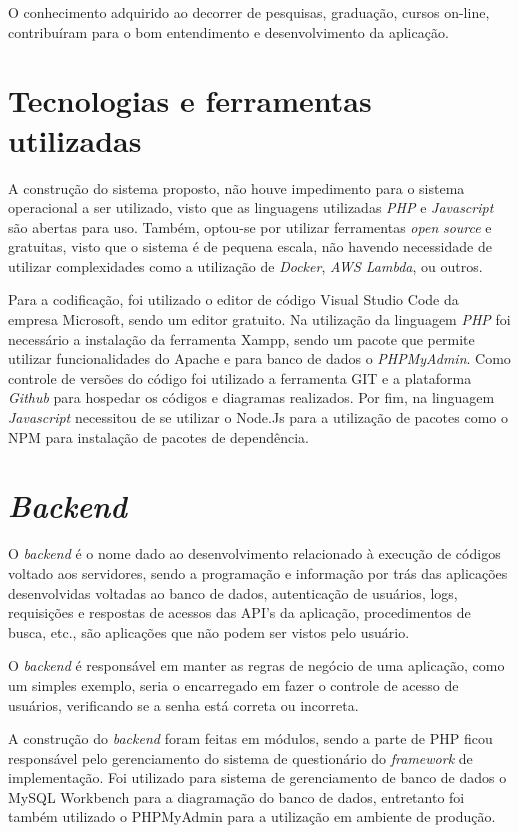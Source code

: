 \documentclass[
	12pt,				%
	openright,			%
	oneside,			%
	a4paper,			%
	english,			%
	french,				%
	spanish,			%
	brazil,				%
	]{abntex2}
\begin{document}
O conhecimento adquirido ao decorrer de pesquisas, graduação, cursos on-line, contribuíram para o bom entendimento e desenvolvimento da aplicação.


\section{Tecnologias e ferramentas utilizadas}

A construção do sistema proposto, não houve impedimento para o sistema operacional a ser utilizado, visto que as linguagens utilizadas \textit{PHP} e \textit{Javascript} são abertas para uso. Também, optou-se por utilizar ferramentas \textit{open} \textit{source} e gratuitas, visto que o sistema é de pequena escala, não havendo necessidade de utilizar complexidades como a utilização de \textit{Docker}, \textit{AWS Lambda}, ou outros.

Para a codificação, foi utilizado o editor de código Visual Studio Code da empresa Microsoft, sendo um editor gratuito. Na utilização da linguagem \textit{PHP} foi necessário a instalação da ferramenta Xampp, sendo um pacote que permite utilizar funcionalidades do Apache e para banco de dados o \textit{PHPMyAdmin}. Como controle de versões do código foi utilizado a ferramenta GIT e a plataforma \textit{Github} para hospedar os códigos e diagramas realizados. Por fim, na linguagem \textit{Javascript} necessitou de se utilizar o Node.Js para a utilização de pacotes como o NPM para instalação de pacotes de dependência.  

\section{\textit{Backend}}

O \textit{backend} é o nome dado ao desenvolvimento relacionado à execução de códigos voltado aos servidores, sendo a programação e informação por trás das aplicações desenvolvidas voltadas ao banco de dados, autenticação de usuários, logs, requisições e respostas de acessos das API’s da aplicação, procedimentos de busca, etc., são aplicações que não podem ser vistos pelo usuário.

O \textit{backend} é responsável em manter as regras de negócio de uma aplicação, como um simples exemplo, seria o encarregado em fazer o controle de acesso de usuários, verificando se a senha está correta ou incorreta.

A construção do \textit{backend} foram feitas em módulos, sendo a parte de PHP ficou responsável pelo gerenciamento do sistema de questionário do \textit{framework} de implementação. Foi utilizado para sistema de gerenciamento de banco de dados o MySQL Workbench para a diagramação do banco de dados, entretanto foi também utilizado o PHPMyAdmin para a utilização em ambiente de produção.
\end{document}
